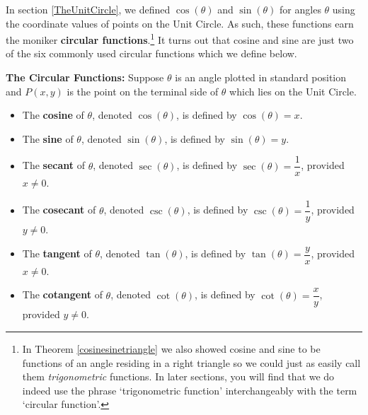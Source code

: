 

\setcounter{footnote}{0}

\label{CircularFunctions}

In section \ref{TheUnitCircle},  we defined $\cos(\theta)$ and $\sin(\theta)$  for angles $\theta$ using the coordinate values of points on the Unit Circle.  As such, these functions earn the moniker \textbf{circular functions}.\footnote{In Theorem \ref{cosinesinetriangle} we also showed cosine and sine to be functions of an angle residing in a right triangle so we could just as easily call them \emph{trigonometric} functions.  In later sections, you will find that we do indeed use the phrase `trigonometric function' interchangeably with the term `circular function'.} It turns out that cosine and sine are just two of the six commonly used circular functions which we define below. 

\enlargethispage{.2in}


\colorbox{ResultColor}{\bbm

\begin{defn} \label{circularfunctions}  \textbf{The Circular Functions:} Suppose $\theta$ is an angle plotted in standard position and $P(x,y)$ is the point on the terminal side of $\theta$ which lies on the Unit Circle.  

\begin{itemize}

\item The  \textbf{cosine} of $\theta$, denoted $\cos(\theta)$, is defined by $\cos(\theta) = x$.

\item The  \textbf{sine} of $\theta$, denoted $\sin(\theta)$, is defined by $\sin(\theta) = y$.

\item The  \textbf{secant} of $\theta$, denoted $\sec(\theta)$, is defined by $\sec(\theta) = \dfrac{1}{x}$, provided $x \neq 0$.

\item The  \textbf{cosecant} of $\theta$, denoted $\csc(\theta)$, is defined by $\csc(\theta) = \dfrac{1}{y}$, provided $y \neq 0$.

\item The  \textbf{tangent} of $\theta$, denoted $\tan(\theta)$, is defined by $\tan(\theta) = \dfrac{y}{x}$, provided $x \neq 0$.

\item The  \textbf{cotangent} of $\theta$, denoted $\cot(\theta)$, is defined by $\cot(\theta) = \dfrac{x}{y}$, provided $y \neq 0$.

\end{itemize}

\end{defn}

\ebm}

